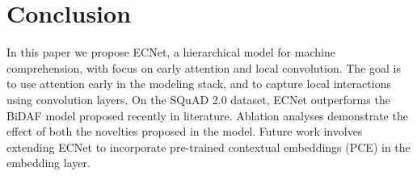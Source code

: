 \section{Conclusion}
\label{sec:conclusion}

In this paper we propose ECNet, a hierarchical model for machine comprehension, with focus on early attention and local convolution. The goal is to use attention early in the modeling stack, and to capture local interactions using convolution layers. On the SQuAD 2.0 dataset, ECNet outperforms the BiDAF \cite{seo2016bidirectional} model proposed recently in literature.  Ablation analyses demonstrate the effect of both the novelties proposed in the model. Future work involves extending ECNet to incorporate pre-trained contextual embeddings (PCE) in the embedding layer. 

